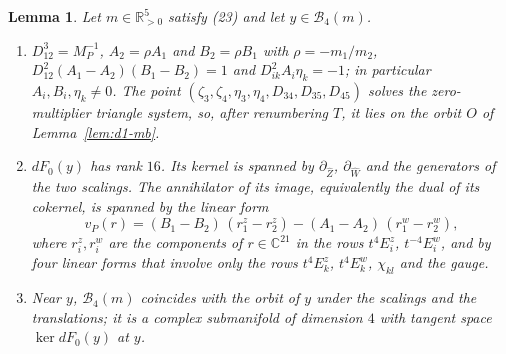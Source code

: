 \documentclass[11pt]{amsart}
\newenvironment{alphalist}{\begin{enumerate}\renewcommand{\labelenumi}{(\alph{enumi})}%
  \renewcommand{\theenumi}{\alph{enumi}}}{\end{enumerate}}
\newtheorem{lemma}[theorem]{Lemma}
\theoremstyle{definition}
\theoremstyle{remark}
\newcommand{\C}{\mathbb{C}}
\newcommand{\Rp}{\mathbb{R}_{>0}}
\begin{document}
\begin{lemma}\label{lem:d4-fibre}
Let $m\in\Rp^5$ satisfy (23) and let $y\in\mathcal B_4(m)$.
\begin{alphalist}
  \item $D_{12}^3=M_P^{-1}$, $A_2=\rho A_1$ and $B_2=\rho B_1$ with $\rho=-m_1/m_2$,
  $D_{12}^2(A_1-A_2)(B_1-B_2)=1$ and $D_{ik}^2A_i\eta_k=-1$; in particular $A_i,B_i,\eta_k\ne0$.
  The point $(\zeta_3,\zeta_4,\eta_3,\eta_4,D_{34},D_{35},D_{45})$ solves the zero-multiplier
  triangle system, so, after renumbering $T$, it lies on the orbit $O$ of Lemma~\ref{lem:d1-mb}.
  \item $dF_0(y)$ has rank $16$.  Its kernel is spanned by $\partial_{\hat Z}$, $\partial_{\hat W}$
  {and the generators of the two scalings.  The annihilator of its image, equivalently the
dual of its cokernel, is spanned by the linear form}
  \[
    v_P(r)=(B_1-B_2)\,(r^z_1-r^z_2)-(A_1-A_2)\,(r^w_1-r^w_2),
  \]
  where $r^z_i,r^w_i$ are the components of $r\in\C^{21}$ in the rows $t^4E^z_i$, $t^{-4}E^w_i$, and
  by four linear forms that involve only the rows $t^4E^z_k$, $t^4E^w_k$, $\chi_{kl}$ and the gauge.
  \item Near $y$, $\mathcal B_4(m)$ coincides with the orbit of $y$ under the scalings and
  the translations; it is a complex submanifold of dimension $4$ with tangent space
  $\ker dF_0(y)$ at $y$.
\end{alphalist}
\end{lemma}
\end{document}
